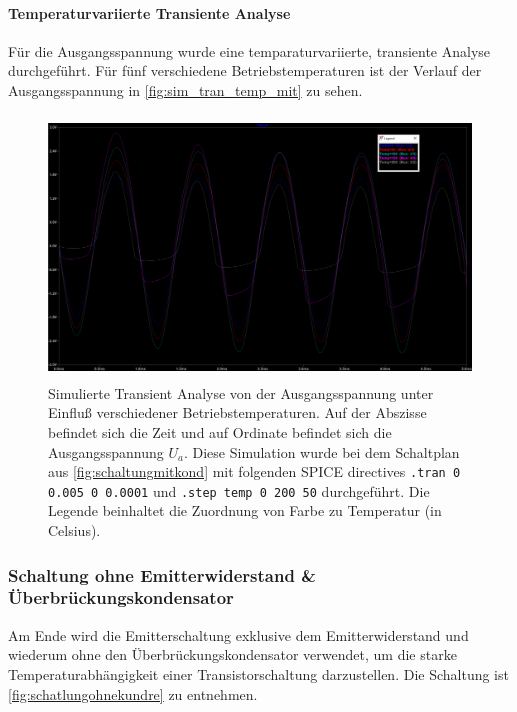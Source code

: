 \documentclass[12pt,english,ngerman]{scrartcl}
\begin{document}
\paragraph{Temperaturvariierte Transiente Analyse}
Für die Ausgangsspannung wurde eine temparaturvariierte, transiente Analyse durchgeführt. Für fünf verschiedene Betriebstemperaturen ist der Verlauf der Ausgangsspannung in \autoref{fig:sim_tran_temp_mit} zu sehen.
\begin{figure}[H]
  \centering
    \includegraphics[width=\linewidth, height=7cm]{./figures/mitkond/ausgangmitkondtempsweep20mv.png }
    \caption[Simulierte Transient Analyse mit
    Überbrückungskondensator]{Simulierte Transient Analyse von der
      Ausgangsspannung unter Einfluß verschiedener Betriebstemperaturen. Auf
      der Abszisse befindet sich die Zeit und auf Ordinate befindet sich die
      Ausgangsspannung $U_a$. Diese Simulation wurde bei dem Schaltplan aus
    \autoref{fig:schaltungmitkond} mit folgenden SPICE directives \texttt{.tran
      0 0.005 0 0.0001} und \texttt{.step temp 0 200 50} durchgeführt. Die Legende
    beinhaltet die Zuordnung von Farbe zu Temperatur (in Celsius).}
  \label{fig:sim_tran_temp_mit}
\end{figure}



\subsubsection{Schaltung ohne Emitterwiderstand \& Überbrückungskondensator}
Am Ende wird die Emitterschaltung exklusive dem Emitterwiderstand und wiederum
ohne den Überbrückungskondensator verwendet, um die starke
Temperaturabhängigkeit einer Transistorschaltung darzustellen. Die Schaltung
ist  \autoref{fig:schatlungohnekundre} zu entnehmen.
\end{document}
